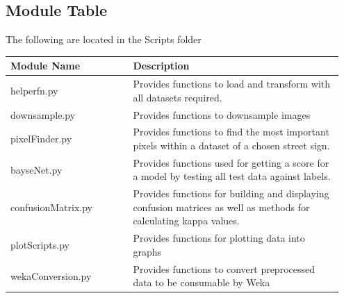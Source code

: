 \documentclass[11pt]{article}
\begin{document}
\pagebreak
\appendix
\appendixpage
\addappheadtotoc
\begin{appendices}
\section{}
\subsection{Module Table}\label{tab:moduleTable}
The following are located in the Scripts folder
\begin{table}[ht]
    \centering
    \begin{tabular}{p{0.35\linewidth} | p{0.6\linewidth}} 
      \textbf{Module Name}  & \textbf{Description} \\ \hline
      helperfn.py & Provides functions to load and transform with all datasets required. \\ \hline
      downsample.py & Provides functions to downsample images  \\ \hline
      pixelFinder.py & Provides functions to find the most important pixels within a dataset of a chosen street sign. \\ \hline
      bayseNet.py & Provides functions used for getting a score for a model by testing all test data against labels. \\ \hline
      confusionMatrix.py & Provides functions for building and displaying confusion matrices as well as methods for calculating kappa values. \\ \hline
      plotScripts.py & Provides functions for plotting data into graphs \\ \hline
      wekaConversion.py & Provides functions to convert preprocessed data to be consumable by Weka
    \end{tabular}
\end{table}

\newpage

\end{appendices}
\end{document}

